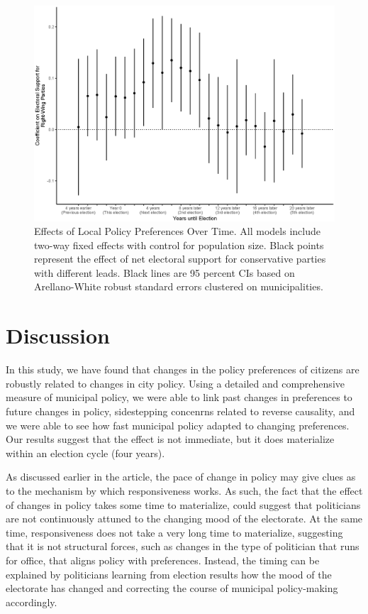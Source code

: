 \documentclass[a4paper,12pt]{article}
\begin{document}
\begin{figure}[htbp]
	\centering
	\includegraphics[scale = .65]{dynamics.eps}
	\caption{Effects of Local Policy Preferences Over Time. All models include two-way fixed effects with control for population size. Black points represent the effect of net electoral support for conservative parties with different leads. Black lines are 95 percent CIs based on Arellano-White robust standard errors clustered on municipalities. }
	\label{fig:LongRun}
\end{figure}




\section*{Discussion}

In this study, we have found that changes in the policy preferences of citizens are robustly related to changes in city policy.  Using a detailed and comprehensive measure of municipal policy, we were able to link past changes in preferences to future changes in policy, sidestepping concenrns related to reverse causality, and we were able to see how fast municipal policy adapted to changing preferences. Our results suggest that the effect is not immediate, but it does materialize within an election cycle (four years).

As discussed earlier in the article, the pace of change in policy may give clues as to the mechanism by which responsiveness works. As such, the fact that the effect of changes in policy takes some time to materialize, could suggest that politicians are not continuously  attuned to the changing mood of the electorate. At the same time, responsiveness does not take a very long time to materialize, suggesting that it is not structural forces, such as changes in the type of politician that runs for office, that aligns policy with preferences. Instead, the timing can be explained by politicians learning from election results how the mood of the electorate has changed and correcting the course of municipal policy-making accordingly. 
\end{document}
